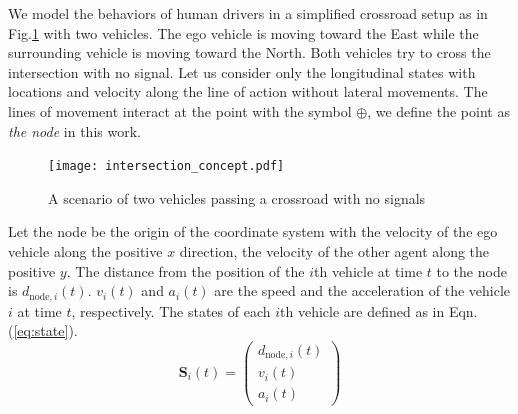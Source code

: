  


We model the behaviors of human drivers in a simplified crossroad setup as in Fig.\ref{fig:model_demo} with two vehicles. The ego vehicle is moving toward the East while the surrounding vehicle is moving toward the North. Both vehicles try to cross the intersection with no signal. Let us consider only the longitudinal states with locations and velocity along the line of action without lateral movements. The lines of movement interact at the point with the symbol $\oplus$, we define the point as \emph{the node} in this work.
\begin{figure}[htbp]
\begin{center}
\texttt{[image: intersection\_concept.pdf]}
\end{center}
\caption{A scenario of two vehicles passing a crossroad with no signals}
\label{fig:model_demo} 
\end{figure}

Let the node be the origin of the coordinate system with the velocity of the ego vehicle along the positive $x$ direction, the velocity of the other agent along the positive $y$. The distance from the position of the $i$th vehicle at time $t$ to the node is $d_{\mathrm{node}, i}(t)$. $v_i(t)$ and $a_i(t)$ are the speed and the acceleration of the vehicle $i$ at time $t$, respectively. The states of each $i$th vehicle are defined as in Eqn.(\ref{eq:state}). 
\begin{equation}
\mathbf{S}_i(t) = \left( \begin{array}{c} d_{\text{node},i}(t) \\ 
v_i(t) \\ 
a_i(t) 
\end{array} \right) 
\label{eq:state}
\end{equation}


